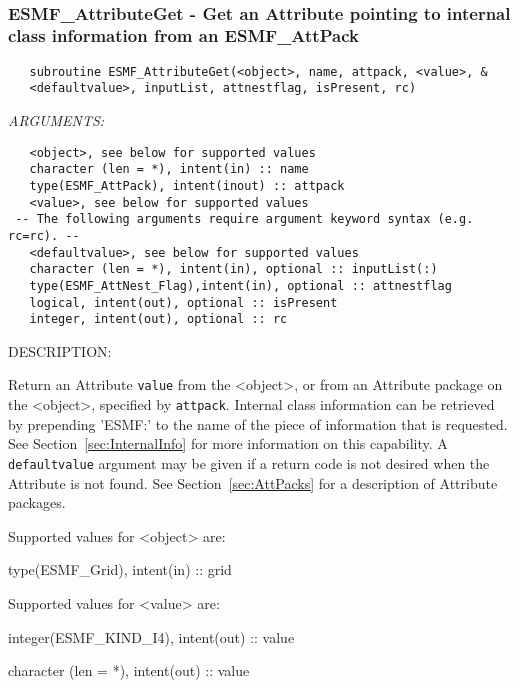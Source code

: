    
 
\mbox{}\hrulefill\ 
 
\subsubsection [ESMF\_AttributeGet] {ESMF\_AttributeGet - Get an Attribute pointing to internal class information from an ESMF\_AttPack}


  
\begin{verbatim}   subroutine ESMF_AttributeGet(<object>, name, attpack, <value>, &
   <defaultvalue>, inputList, attnestflag, isPresent, rc)\end{verbatim}{\em ARGUMENTS:}
\begin{verbatim}   <object>, see below for supported values
   character (len = *), intent(in) :: name
   type(ESMF_AttPack), intent(inout) :: attpack
   <value>, see below for supported values
 -- The following arguments require argument keyword syntax (e.g. rc=rc). --
   <defaultvalue>, see below for supported values
   character (len = *), intent(in), optional :: inputList(:)
   type(ESMF_AttNest_Flag),intent(in), optional :: attnestflag
   logical, intent(out), optional :: isPresent
   integer, intent(out), optional :: rc\end{verbatim}
{\sf DESCRIPTION:\\ }


   Return an Attribute {\tt value} from the <object>, or from an Attribute
   package on the <object>, specified by {\tt attpack}. Internal class information can
   be retrieved by prepending 'ESMF:' to the name of the
   piece of information that is requested. See
   Section~\ref{sec:InternalInfo} for more information
   on this capability.
   A {\tt defaultvalue} argument
   may be given if a return code is not desired when the Attribute is not
   found. See Section~\ref{sec:AttPacks} for a description of Attribute
   packages.
  
   Supported values for <object> are:
   \begin{description}
   \item type(ESMF\_Grid), intent(in) :: grid
   \end{description}
  
   Supported values for <value> are:
   \begin{description}
   \item integer(ESMF\_KIND\_I4), intent(out) :: value
   \item character (len = *), intent(out) :: value
   \end{description}
  
